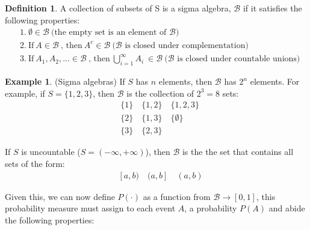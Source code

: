 \documentclass[
  oneside,
  11pt, a4paper,
  footinclude=true,
  headinclude=true,
  cleardoublepage=empty
]{scrbook}
\theoremstyle{definition}
\newtheorem{definition}{Definition}[section]
\theoremstyle{definition}
\newtheorem{example}{Example}[definition]
\begin{document}
                \begin{definition}{A collection of subsets of S is a sigma algebra, $\mathscr{B}$ if it satisfies the following properties:}
                \begin{align*}
                    &1.\ \emptyset \in \mathscr{B}\ \text{(the empty set is an element of $\mathscr{B}$)}\\
                    &2.\ \text{If}\ A \in \mathscr{B}\ \text{, then}\ A^c \in \mathscr{B}\  \text{($\mathscr{B}$ is closed under complementation)}\\
                    &3.\ \text{If}\ A_1, A_2, ... \in \mathscr{B}\ \text{, then}\ \bigcup_{i=1}^{\infty} A_i \ \in \mathscr{B}\ \text{($\mathscr{B}$ is closed under countable unions)}
                \end{align*}{}
                \end{definition}{}
                
                \begin{example}{(Sigma algebras)}
                    If $S$ has $n$ elements, then $\mathscr{B}$ has $2^n$ elements. For example, if $S = \{1,2,3\}$, then $\mathscr{B}$ is the collection of $2^3 = 8$ sets:
                    \begin{align*}
                        &\{1\}\quad \{1,2\}\quad \{1,2,3\} \\
                        &\{2\}\quad \{1,3\}\quad \{\emptyset\} \\
                        &\{3\}\quad \{2,3\}
                    \end{align*}{}
                    
                    If $S$ is uncountable ($S = (-\infty, +\infty)$), then $\mathscr{B}$ is the the set that contains all sets of the form:
                    \begin{align*}
                       [a, b]\quad [a, b)\quad (a, b]\quad (a, b) 
                    \end{align*}{}
                \end{example}{}
                
                Given this, we can now define $P(\cdot)$ as a function from $\mathscr{B} \rightarrow [0,1]$, this probability measure must assign to each event $A$, a probability $P(A)$ and abide the following properties:
                
\end{document}
